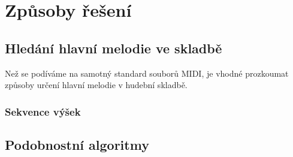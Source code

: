 \section{Způsoby řešení}

\subsection{Hledání hlavní melodie ve skladbě}
Než se podíváme na samotný standard souborů MIDI, je vhodné prozkoumat způsoby určení hlavní melodie v hudební skladbě.

\subsubsection*{Sekvence výšek}

\subsection{Podobnostní algoritmy}